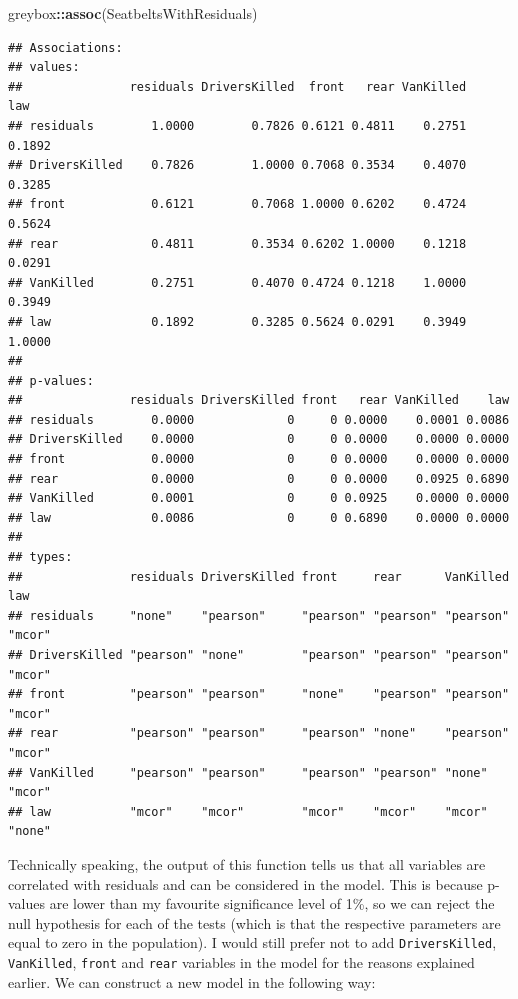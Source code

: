\documentclass[]{book}
\newenvironment{Shaded}{\begin{snugshade}}{\end{snugshade}}
\newcommand{\KeywordTok}[1]{\textcolor[rgb]{0.13,0.29,0.53}{\textbf{#1}}}
\newcommand{\NormalTok}[1]{#1}
\newcommand{\OperatorTok}[1]{\textcolor[rgb]{0.81,0.36,0.00}{\textbf{#1}}}
\theoremstyle{definition}
\theoremstyle{definition}
\theoremstyle{definition}
\theoremstyle{definition}
\theoremstyle{remark}
\begin{document}
\begin{Shaded}
\begin{Highlighting}[]
\NormalTok{greybox}\OperatorTok{::}\KeywordTok{assoc}\NormalTok{(SeatbeltsWithResiduals)}
\end{Highlighting}
\end{Shaded}

\begin{verbatim}
## Associations: 
## values:
##               residuals DriversKilled  front   rear VanKilled    law
## residuals        1.0000        0.7826 0.6121 0.4811    0.2751 0.1892
## DriversKilled    0.7826        1.0000 0.7068 0.3534    0.4070 0.3285
## front            0.6121        0.7068 1.0000 0.6202    0.4724 0.5624
## rear             0.4811        0.3534 0.6202 1.0000    0.1218 0.0291
## VanKilled        0.2751        0.4070 0.4724 0.1218    1.0000 0.3949
## law              0.1892        0.3285 0.5624 0.0291    0.3949 1.0000
## 
## p-values:
##               residuals DriversKilled front   rear VanKilled    law
## residuals        0.0000             0     0 0.0000    0.0001 0.0086
## DriversKilled    0.0000             0     0 0.0000    0.0000 0.0000
## front            0.0000             0     0 0.0000    0.0000 0.0000
## rear             0.0000             0     0 0.0000    0.0925 0.6890
## VanKilled        0.0001             0     0 0.0925    0.0000 0.0000
## law              0.0086             0     0 0.6890    0.0000 0.0000
## 
## types:
##               residuals DriversKilled front     rear      VanKilled law   
## residuals     "none"    "pearson"     "pearson" "pearson" "pearson" "mcor"
## DriversKilled "pearson" "none"        "pearson" "pearson" "pearson" "mcor"
## front         "pearson" "pearson"     "none"    "pearson" "pearson" "mcor"
## rear          "pearson" "pearson"     "pearson" "none"    "pearson" "mcor"
## VanKilled     "pearson" "pearson"     "pearson" "pearson" "none"    "mcor"
## law           "mcor"    "mcor"        "mcor"    "mcor"    "mcor"    "none"
\end{verbatim}

Technically speaking, the output of this function tells us that all variables are correlated with residuals and can be considered in the model. This is because p-values are lower than my favourite significance level of 1\%, so we can reject the null hypothesis for each of the tests (which is that the respective parameters are equal to zero in the population). I would still prefer not to add \texttt{DriversKilled}, \texttt{VanKilled}, \texttt{front} and \texttt{rear} variables in the model for the reasons explained earlier. We can construct a new model in the following way:
\end{document}
